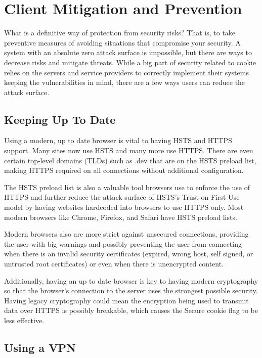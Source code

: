 \documentclass[conference,12pt]{IEEEtran}
\begin{document}
\section{Client Mitigation and Prevention}

What is a definitive way of protection from security risks? That is, to take
preventive measures of avoiding situations that compromise your security.  A
system with an absolute zero attack surface is impossible, but there are ways to
decrease risks and mitigate threats.  While a big part of security related to
cookie relies on the servers and service providers to correctly implement their
systems keeping the vulnerabilities in mind, there are a few ways users can
reduce the attack surface.

\subsection{Keeping Up To Date}

Using a modern, up to date browser is vital to having HSTS and HTTPS support.
Many sites now use HSTS and many more use HTTPS.  There are even certain
top-level domains (TLDs) such as .dev that are on the HSTS preload list, making
HTTPS required on all connections without additional configuration.

The HSTS preload list is also a valuable tool browsers use to enforce the use of
HTTPS and further reduce the attack surface of HSTS’s Trust on First Use model
by having websites hardcoded into browsers to use HTTPS only.  Most modern
browsers like Chrome, Firefox, and Safari have HSTS preload lists.  

Modern browsers also are more strict against unsecured connections, providing
the user with big warnings and possibly preventing the user from connecting when
there is an invalid security certificates (expired, wrong host, self signed, or
untrusted root certificates) or even when there is unencrypted content.

Additionally, having an up to date browser is key to having modern cryptography
so that the browser’s connection to the server uses the strongest possible
security.  Having legacy cryptography could mean the encryption being used to
transmit data over HTTPS is possibly breakable, which causes the Secure cookie
flag to be less effective.

\subsection{Using a VPN}
\end{document}
